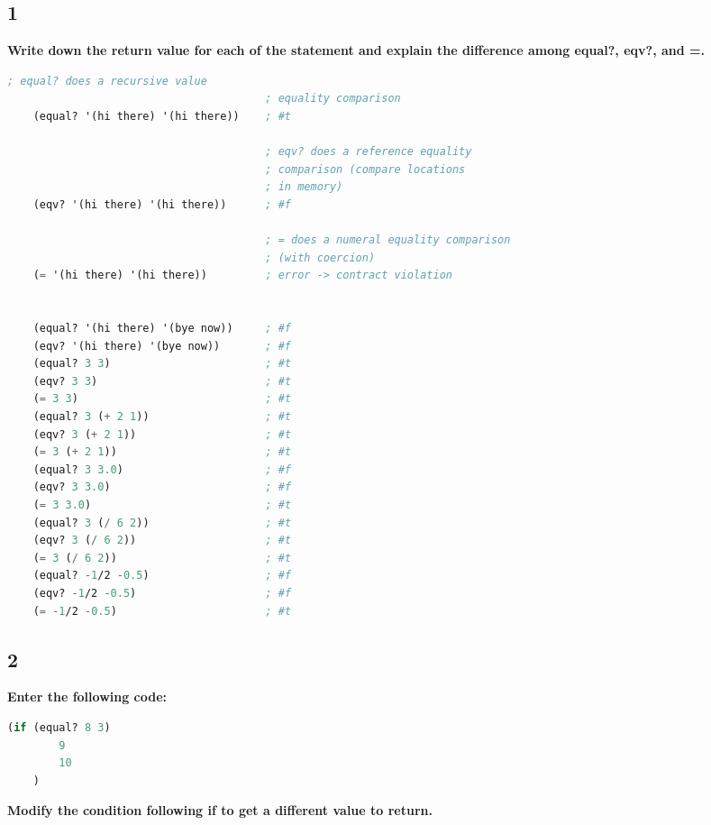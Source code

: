 \documentclass{article}
\begin{document}
\subsection*{1}
\begin{adjustwidth}{2em}{0em}
    \textbf{Write down the return value for each of the statement and explain the difference among equal?, eqv?, and =. }
\end{adjustwidth}

\begin{lstlisting}[language=lisp,style=redStyle]
                                        ; equal? does a recursive value 
                                        ; equality comparison
    (equal? '(hi there) '(hi there))    ; #t
    
                                        ; eqv? does a reference equality 
                                        ; comparison (compare locations 
                                        ; in memory)
    (eqv? '(hi there) '(hi there))      ; #f 
    
                                        ; = does a numeral equality comparison 
                                        ; (with coercion)
    (= '(hi there) '(hi there))         ; error -> contract violation
    
    
    (equal? '(hi there) '(bye now))     ; #f
    (eqv? '(hi there) '(bye now))       ; #f
    (equal? 3 3)                        ; #t
    (eqv? 3 3)                          ; #t
    (= 3 3)                             ; #t
    (equal? 3 (+ 2 1))                  ; #t
    (eqv? 3 (+ 2 1))                    ; #t
    (= 3 (+ 2 1))                       ; #t
    (equal? 3 3.0)                      ; #f
    (eqv? 3 3.0)                        ; #f
    (= 3 3.0)                           ; #t
    (equal? 3 (/ 6 2))                  ; #t
    (eqv? 3 (/ 6 2))                    ; #t
    (= 3 (/ 6 2))                       ; #t
    (equal? -1/2 -0.5)                  ; #f
    (eqv? -1/2 -0.5)                    ; #f
    (= -1/2 -0.5)                       ; #t
\end{lstlisting}

\subsection*{2}
\begin{adjustwidth}{2em}{0em}
    \textbf{Enter the following code:}
\end{adjustwidth}
\begin{lstlisting}[language=lisp]
    (if (equal? 8 3) 
        9 
        10
    ) 
\end{lstlisting}
\begin{adjustwidth}{2em}{0em}
    \textbf{Modify the condition following if to get a different value to return. }
\end{adjustwidth}
\end{document}
